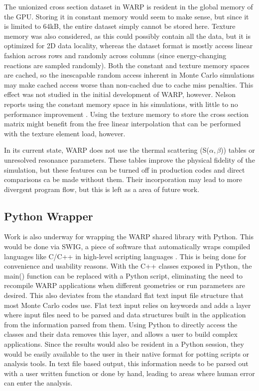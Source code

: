 The unionized cross section dataset in WARP is resident in the global memory of the GPU.  Storing it in constant memory would seem to make sense, but since it is limited to 64kB, the entire dataset simply cannot be stored here.  Texture memory was also considered, as this could possibly contain all the data, but it is optimized for 2D data locality, whereas the dataset format is mostly access linear fashion across rows and randomly across columns (since energy-changing reactions are sampled randomly).  Both the constant and texture memory spaces are cached, so the inescapable  random access inherent in Monte Carlo simulations may make cached access worse than non-cached due to cache miss penalties.  This effect was not studied in the initial development of WARP, however.  Nelson reports using the constant memory space in his simulations, with little to no performance improvement \cite{nelson}.  Using the texture memory to store the cross section matrix might benefit from the free linear interpolation that can be performed with the texture element load, however.

In its current state, WARP does not use the thermal scattering (S($\alpha,$$\beta$)) tables or unresolved resonance parameters.   These tables improve the physical fidelity of the simulation, but these features can be turned off in production codes and direct comparisons ca be made without them.  Their incorporation may lead to more divergent program flow, but this is left as a area of future work.

\subsection{Python Wrapper}

Work is also underway for wrapping the WARP shared library with Python.  This would be done via SWIG, a piece of software that automatically wraps compiled languages like C/C++ in high-level scripting languages \cite{swig}.  This is being done for convenience and usability reasons.  With the C++ classes exposed in Python, the main() function can be replaced with a Python script, eliminating the need to recompile WARP applications when different geometries or run parameters are desired.  This also deviates from the standard flat text input file structure that most Monte Carlo codes use.  Flat text input relies on keywords and adds a layer where input files need to be parsed and data structures built in the application from the information parsed from them.  Using Python to directly access the classes and their data removes this layer, and allows a user to build complex applications.  Since the results would also be resident in a Python session, they would be easily available to the user in their native format for potting scripts or analysis tools.  In text file based output, this information needs to be parsed out with a user written function or done by hand, leading to areas where human error can enter the analysis.

